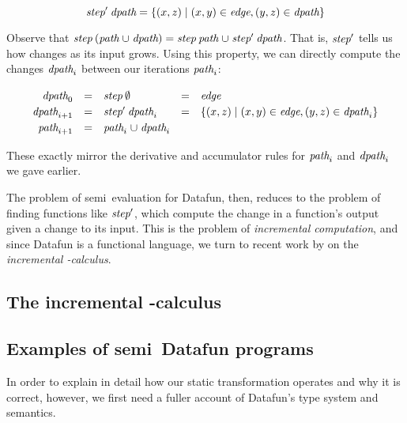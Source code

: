 \nopagebreak[2]
\[
\text{\itshape step}' \mskip 4mu plus 4mu minus 1mu\text{\itshape dpath} =
\{(x,z) \mathrel{|} (x,y) \in \text{\itshape edge}, (y,z) \in \text{\itshape dpath}\}
\]

\noindent
Observe that $\name{step} \<(\name{path} \cup \name{dpath}) =
\name{step}\<\name{path} \cup \name{step}'\<\name{dpath}$.
%
That is, $\text{\itshape step}'$ tells us how  changes as its input grows.
%
Using this property, we can directly compute the changes $\text{\itshape dpath}_i$
between our iterations $\text{\itshape path}_i$:


\[\def\arraystretch{1.2}
\begin{array}{rclcl}
  \name{dpath}_0 &=& \name{step}\<\emptyset
  &=& \name{edge}
  \\
  \name{dpath}_{i+1} &=& \name{step}'\<\name{dpath}_i
  &=& \setfor{(x,z)}{(x,y) \in \name{edge}, (y,z) \in \name{dpath}_i}
  \\
  \name{path}_{i+1} &=& \name{path}_i \cup \name{dpath}_i
\end{array}\]

\noindent These exactly mirror the derivative and accumulator rules for
\(\text{\itshape path}_i\) and \(\text{\itshape dpath}_i\) we gave earlier.
%

The problem of semi\naive\ evaluation for Datafun, then, reduces to the problem
of finding functions like $\text{\itshape step}'$, which compute the change in a
function's output given a change to its input.
%
This is the problem of \emph{incremental computation}, and since Datafun is a
functional language, we turn to recent work by \citet{incremental} on the
\emph{incremental \fn-calculus}.


\subsection{The incremental \boldfn-calculus}
\label{sec:seminaive-via-incremental}




\subsection{Examples of semi\naive\ Datafun programs}
\XXX

In order to explain in detail how our static transformation operates and why it
is correct, however, we first need a fuller account of Datafun's type system and
semantics.
